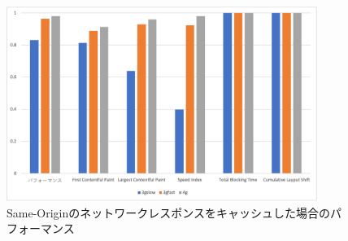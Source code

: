 \begin{figure}
  \centering
  \includegraphics[width=0.9\textwidth]{images/service_worker_cache_same_origin.png}
  \caption{Same-Originのネットワークレスポンスをキャッシュした場合のパフォーマンス}\label{figure:Same-Originのネットワークレスポンスをキャッシュした場合のパフォーマンス}
\end{figure}